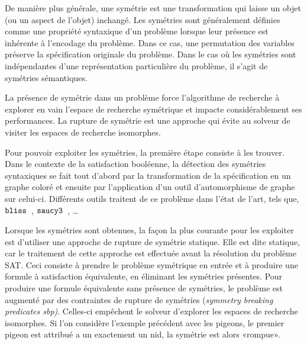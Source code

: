 De manière plus  générale, une symétrie est une transformation qui laisse un objet (ou un aspect de l'objet) inchangé. Les symétries sont généralement définies comme une propriété syntaxique d'un problème lorsque leur présence est inhérente à l'encodage du problème.
Dans ce cas, une permutation des variables préserve la spécification originale du problème.
Dans le cas où les symétries sont indépendantes d'une représentation particulière du problème, il s'agit de symétries sémantiques.

La présence de symétrie dans un problème force l'algorithme de recherche à explorer en vain l'espace de recherche symétrique et impacte considérablement ses performances.  La rupture de symétrie est une approche qui évite au solveur de visiter les espaces de recherche isomorphes.

Pour pouvoir exploiter les symétries, la première étape consiste à les trouver. Dans le contexte de la satisfaction booléenne, la détection des symétries syntaxiques se fait tout d'abord par la transformation de la spécification en un graphe coloré et ensuite par l'application d'un outil d'automorphisme de graphe sur celui-ci.
Différents outils traitent de ce problème dans l'état de l'art, tels que, $\texttt{bliss}$~\cite{JunttilaKaski:ALENEX2007}, $\texttt{saucy3}$~\cite{katebi2010symmetry}, …


Lorsque les symétries sont obtenues, la façon la plus courante pour les exploiter est d'utiliser une approche de rupture de symétrie statique. Elle est dite statique, car le traitement de cette approche  est effectuée avant la résolution du problème SAT.
Ceci consiste à prendre le problème symétrique en entrée et à produire une formule à satisfaction équivalente, en éliminant les symétries présentes. %
Pour produire une formule équivalente sans présence de symétries, le problème est augmenté par des 
contraintes de rupture de  symétries  (\textit{symmetry breaking predicates sbp)}.
 Celles-ci empêchent le solveur d'explorer les espaces de recherche isomorphes. 
Si l'on considère l'exemple précédent avec les pigeons, le premier pigeon est attribué a un
exactement un nid, la symétrie est alors «rompue».

